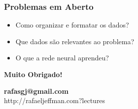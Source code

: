 \documentclass[aspectratio=169,12pt]{beamer}
\begin{document}
\begin{frame}
    \frametitle{Problemas em Aberto}
    \begin{itemize}
        \setlength\itemsep{1em}
        \item{Como organizar e formatar os dados?}
        \item{Que dados são relevantes ao problema?}
        \item{O que a rede neural aprendeu?}
    \end{itemize}
\end{frame}

\begin{frame}[b]
    \begin{center}
    \Huge \bfseries Muito Obrigado!
    \end{center}
    \vfill
    \hfill \textbf{rafasgj@gmail.com} \\
    \hfill \footnotesize{http://rafaeljeffman.com?lectures}
\end{frame}
\end{document}
